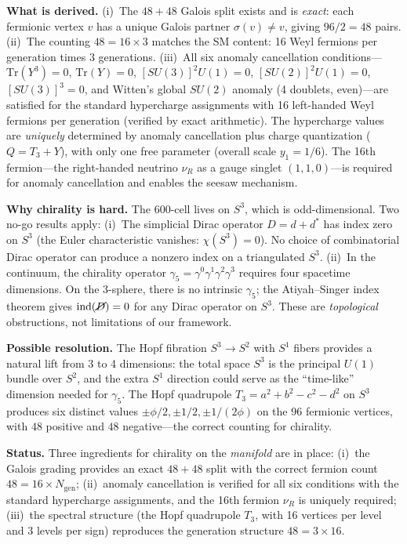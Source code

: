 \documentclass[12pt,a4paper]{article}
\theoremstyle{definition}
\begin{document}
\label{sec:anomaly}
\textbf{What is derived.}  (i)~The $48+48$ Galois split exists and is \emph{exact}: each fermionic vertex $v$ has a unique Galois partner $\sigma(v) \neq v$, giving $96/2 = 48$ pairs.  (ii)~The counting $48 = 16 \times 3$ matches the SM content: 16 Weyl fermions per generation times 3 generations.  (iii)~All six anomaly cancellation conditions---$\text{Tr}(Y^3) = 0$, $\text{Tr}(Y) = 0$, $[SU(3)]^2 U(1) = 0$, $[SU(2)]^2 U(1) = 0$, $[SU(3)]^3 = 0$, and Witten's global $SU(2)$ anomaly (4 doublets, even)---are satisfied for the standard hypercharge assignments with 16 left-handed Weyl fermions per generation (verified by exact arithmetic).  The hypercharge values are \emph{uniquely} determined by anomaly cancellation plus charge quantization ($Q = T_3 + Y$), with only one free parameter (overall scale $y_1 = 1/6$).  The 16th fermion---the right-handed neutrino $\nu_R$ as a gauge singlet $(1,1,0)$---is required for anomaly cancellation and enables the seesaw mechanism.

\textbf{Why chirality is hard.}  The 600-cell lives on $S^3$, which is odd-dimensional.  Two no-go results apply: (i)~The simplicial Dirac operator $D = d + d^*$ has index zero on $S^3$ (the Euler characteristic vanishes: $\chi(S^3) = 0$).  No choice of combinatorial Dirac operator can produce a nonzero index on a triangulated $S^3$.  (ii)~In the continuum, the chirality operator $\gamma_5 = \gamma^0 \gamma^1 \gamma^2 \gamma^3$ requires four spacetime dimensions.  On the 3-sphere, there is no intrinsic $\gamma_5$; the Atiyah--Singer index theorem gives $\text{ind}(\cancel{D}) = 0$ for any Dirac operator on $S^3$.  These are \emph{topological} obstructions, not limitations of our framework.

\textbf{Possible resolution.}  The Hopf fibration $S^3 \to S^2$ with $S^1$ fibers provides a natural lift from 3 to 4 dimensions: the total space $S^3$ is the principal $U(1)$ bundle over $S^2$, and the extra $S^1$ direction could serve as the ``time-like'' dimension needed for $\gamma_5$.  The Hopf quadrupole $T_3 = a^2 + b^2 - c^2 - d^2$ on $S^3$ produces six distinct values $\pm\phi/2, \pm 1/2, \pm 1/(2\phi)$ on the 96 fermionic vertices, with $48$ positive and $48$ negative---the correct counting for chirality.

\textbf{Status.}  Three ingredients for chirality on the \emph{manifold} are in place: (i)~the Galois grading provides an exact $48 + 48$ split with the correct fermion count $48 = 16 \times N_{\text{gen}}$; (ii)~anomaly cancellation is verified for all six conditions with the standard hypercharge assignments, and the 16th fermion $\nu_R$ is uniquely required; (iii)~the spectral structure (the Hopf quadrupole $T_3$, with 16 vertices per level and 3 levels per sign) reproduces the generation structure $48 = 3 \times 16$.
\end{document}
